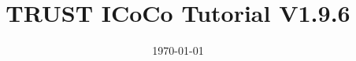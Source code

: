 \documentclass[10pt, hyperref={unicode=true,pdfusetitle, bookmarks=true,bookmarksnumbered=false,bookmarksopen=false, breaklinks=false,pdfborder={0 0 1},backref=true,colorlinks=true,linkcolor=darkblue,pageanchor, urlcolor=darkblue}]{beamer}
\title[TRUST ICoCo Tutorial V1.9.6]{TRUST ICoCo Tutorial V1.9.6}
\institute[CEA/DES/ISAS/DM2S] %
{
CEA Saclay \\ %
\medskip
\textit{Support team: trust@cea.fr} %
\medskip
}
\date{\today} %
\begin{document}
\begin{frame}
\titlepage %
\end{frame}

\begin{frame}
\tableofcontents [hideallsubsections]
\end{frame}
\end{document}
